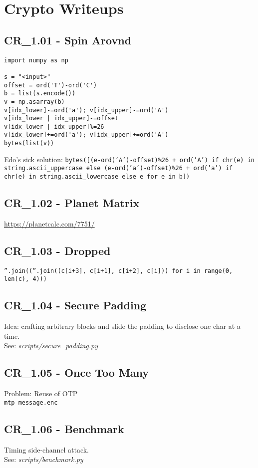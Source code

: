 \chapter{Crypto Writeups}

\section{CR_1.01 - Spin Arovnd}
\begin{verbatim}
import numpy as np

s = "<input>"
offset = ord('T')-ord('C')
b = list(s.encode())
v = np.asarray(b)
v[idx_lower]-=ord('a'); v[idx_upper]-=ord('A')
v[idx_lower | idx_upper]-=offset
v[idx_lower | idx_upper]%=26
v[idx_lower]+=ord('a'); v[idx_upper]+=ord('A')
bytes(list(v))
\end{verbatim} 

Edo's sick solution: \texttt{bytes([(e-ord('A')-offset)\%26 + ord('A') if chr(e) in string.ascii_uppercase else (e-ord('a')-offset)\%26 + ord('a') if chr(e) in string.ascii_lowercase else e for e in b])}

\section{CR_1.02 - Planet Matrix}
\url{https://planetcalc.com/7751/}

\section{CR_1.03 - Dropped}
\texttt{''.join((''.join((c[i+3], c[i+1], c[i+2], c[i])) for i in range(0, len(c), 4)))}

\section{CR_1.04 - Secure Padding}
Idea: crafting arbitrary blocks and slide the padding to disclose one char at a time. \\
See: \textit{scripts/secure_padding.py}

\section{CR_1.05 - Once Too Many}
Problem: Reuse of OTP \\
\texttt{mtp message.enc}

\section{CR_1.06 - Benchmark}
Timing side-channel attack. \\
See: \textit{scripts/benchmark.py}

